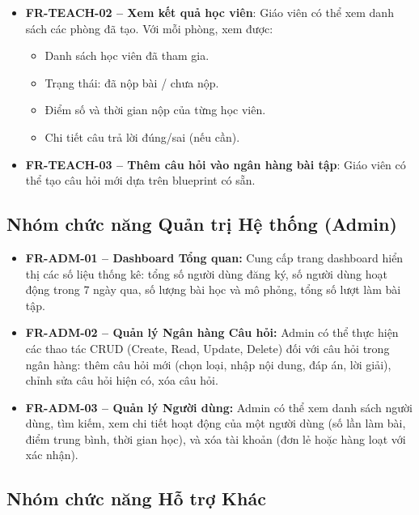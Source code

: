 \begin{itemize}
    \item \textbf{FR-TEACH-02 – Xem kết quả học viên}: Giáo viên có thể xem danh sách các phòng đã tạo. Với mỗi phòng, xem được:
        \begin{itemize}
        \item Danh sách học viên đã tham gia.
        \item Trạng thái: đã nộp bài / chưa nộp.
        \item Điểm số và thời gian nộp của từng học viên.
        \item Chi tiết câu trả lời đúng/sai (nếu cần).
        \end{itemize}

    \item \textbf{FR-TEACH-03 – Thêm câu hỏi vào ngân hàng bài tập}: Giáo viên có thể tạo câu hỏi mới dựa trên blueprint có sẵn.
\end{itemize}

\subsection{Nhóm chức năng Quản trị Hệ thống (Admin)}

\begin{itemize}
    \item \textbf{FR-ADM-01 – Dashboard Tổng quan:} Cung cấp trang dashboard hiển thị các số liệu thống kê: tổng số người dùng đăng ký, số người dùng hoạt động trong 7 ngày qua, số lượng bài học và mô phỏng, tổng số lượt làm bài tập.
    
    \item \textbf{FR-ADM-02 – Quản lý Ngân hàng Câu hỏi:} Admin có thể thực hiện các thao tác CRUD (Create, Read, Update, Delete) đối với câu hỏi trong ngân hàng: thêm câu hỏi mới (chọn loại, nhập nội dung, đáp án, lời giải), chỉnh sửa câu hỏi hiện có, xóa câu hỏi.
    
    \item \textbf{FR-ADM-03 – Quản lý Người dùng:} Admin có thể xem danh sách người dùng, tìm kiếm, xem chi tiết hoạt động của một người dùng (số lần làm bài, điểm trung bình, thời gian học), và xóa tài khoản (đơn lẻ hoặc hàng loạt với xác nhận).
\end{itemize}

\subsection{Nhóm chức năng Hỗ trợ Khác}

